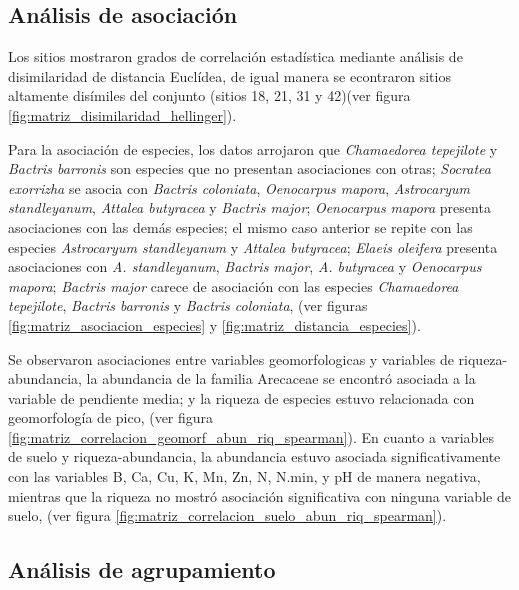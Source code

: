 \documentclass[11pt,]{article}
\begin{document}
\subsection{Análisis de asociación}\label{anuxe1lisis-de-asociaciuxf3n}

Los sitios mostraron grados de correlación estadística mediante análisis
de disimilaridad de distancia Euclídea, de igual manera se econtraron
sitios altamente disímiles del conjunto (sitios 18, 21, 31 y 42)(ver
figura \ref{fig:matriz_disimilaridad_hellinger}).

Para la asociación de especies, los datos arrojaron que
\emph{Chamaedorea tepejilote} y \emph{Bactris barronis} son especies que
no presentan asociaciones con otras; \emph{Socratea exorrizha} se asocia
con \emph{Bactris coloniata}, \emph{Oenocarpus mapora},
\emph{Astrocaryum standleyanum}, \emph{Attalea butyracea} y
\emph{Bactris major}; \emph{Oenocarpus mapora} presenta asociaciones con
las demás especies; el mismo caso anterior se repite con las especies
\emph{Astrocaryum standleyanum} y \emph{Attalea butyracea}; \emph{Elaeis
oleifera} presenta asociaciones con \emph{A. standleyanum},
\emph{Bactris major}, \emph{A. butyracea} y \emph{Oenocarpus mapora};
\emph{Bactris major} carece de asociación con las especies
\emph{Chamaedorea tepejilote}, \emph{Bactris barronis} y \emph{Bactris
coloniata}, (ver figuras \ref{fig:matriz_asociacion_especies} y
\ref{fig:matriz_distancia_especies}).

Se observaron asociaciones entre variables geomorfologicas y variables
de riqueza-abundancia, la abundancia de la familia Arecaceae se encontró
asociada a la variable de pendiente media; y la riqueza de especies
estuvo relacionada con geomorfología de pico, (ver figura
\ref{fig:matriz_correlacion_geomorf_abun_riq_spearman}). En cuanto a
variables de suelo y riqueza-abundancia, la abundancia estuvo asociada
significativamente con las variables B, Ca, Cu, K, Mn, Zn, N, N.min, y
pH de manera negativa, mientras que la riqueza no mostró asociación
significativa con ninguna variable de suelo, (ver figura
\ref{fig:matriz_correlacion_suelo_abun_riq_spearman}).

\subsection{Análisis de
agrupamiento}\label{anuxe1lisis-de-agrupamiento-1}
\end{document}

